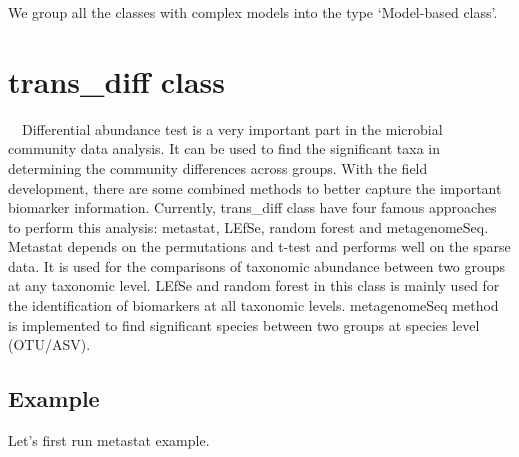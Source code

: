 \documentclass[
]{book}
\newenvironment{Shaded}{\begin{snugshade}}{\end{snugshade}}
\newcommand{\AttributeTok}[1]{\textcolor[rgb]{0.77,0.63,0.00}{#1}}
\newcommand{\CommentTok}[1]{\textcolor[rgb]{0.56,0.35,0.01}{\textit{#1}}}
\newcommand{\DecValTok}[1]{\textcolor[rgb]{0.00,0.00,0.81}{#1}}
\newcommand{\FloatTok}[1]{\textcolor[rgb]{0.00,0.00,0.81}{#1}}
\newcommand{\FunctionTok}[1]{\textcolor[rgb]{0.00,0.00,0.00}{#1}}
\newcommand{\NormalTok}[1]{#1}
\newcommand{\OtherTok}[1]{\textcolor[rgb]{0.56,0.35,0.01}{#1}}
\newcommand{\SpecialCharTok}[1]{\textcolor[rgb]{0.00,0.00,0.00}{#1}}
\newcommand{\StringTok}[1]{\textcolor[rgb]{0.31,0.60,0.02}{#1}}
\begin{document}
We group all the classes with complex models into the type `Model-based class'.

\hypertarget{trans_diff-class}{%
\section{trans\_diff class}\label{trans_diff-class}}

　Differential abundance test is a very important part in the microbial community data analysis.
It can be used to find the significant taxa in determining the community differences across groups.
With the field development, there are some combined methods to better capture the important biomarker information.
Currently, trans\_diff class have four famous approaches to perform this analysis:
metastat\citep{White_Statistical_2009}, LEfSe\citep{Segata_Metagenomic_2011}, random forest and metagenomeSeq\citep{Paulson_Differential_2013}.
Metastat depends on the permutations and t-test and performs well on the sparse data.
It is used for the comparisons of taxonomic abundance between two groups at any taxonomic level.
LEfSe and random forest in this class is mainly used for the identification of biomarkers at all taxonomic levels.
metagenomeSeq method is implemented to find significant species between two groups at species level (OTU/ASV).

\hypertarget{example-5}{%
\subsection{Example}\label{example-5}}

Let's first run metastat example.

\begin{Shaded}
\end{Shaded}
\end{document}
